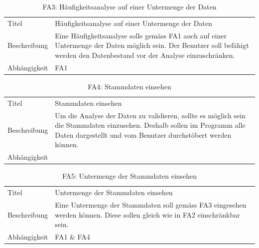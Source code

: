 \begin{table}[H] 
	\caption{FA3: Häufigkeitsanalyse auf einer Untermenge der Daten}
	\centering
	\label{fig:anforderungsanalyse:funktionaleanforderung:fa3}
	\begin{tabular}{ | l | L{10cm} | } 
		\hline 
		 \\ \hline 
		Titel & Häufigkeitsanalyse auf einer Untermenge der Daten \\ \hline 
		Beschreibung & Eine Häufigkeitsanalyse solle gemäss FA1 auch auf einer Untermenge der Daten möglich sein. Der Benutzer soll befähigt werden den Datenbestand vor der Analyse einzuschränken. \\ \hline 
		Abhängigkeit & FA1 \\ \hline 
	\end{tabular}
\end{table}

\begin{table}[H] 
	\caption{FA4: Stammdaten einsehen}
	\centering
	\label{fig:anforderungsanalyse:funktionaleanforderung:fa4}
	\begin{tabular}{ | l | L{10cm} | } 
		\hline 
		 \\ \hline 
		Titel & Stammdaten einsehen \\ \hline 
		Beschreibung & Um die Analyse der Daten zu validieren, sollte es möglich sein die Stammdaten einzusehen. Deshalb sollen im Programm alle Daten dargestellt und vom Benutzer durchstöbert werden können. \\ \hline 
		Abhängigkeit & \\ \hline 
	\end{tabular}
\end{table}

\begin{table}[H] 
	\caption{FA5: Untermenge der Stammdaten einsehen}
	\centering
	\label{fig:anforderungsanalyse:funktionaleanforderung:fa5}
	\begin{tabular}{ | l | L{10cm} | } 
		\hline 
		 \\ \hline 
		Titel & Untermenge der Stammdaten einsehen \\ \hline 
		Beschreibung & Eine Untermenge der Stammdaten soll gemäss FA3 eingesehen werden können. Diese sollen gleich wie in FA2 einschränkbar sein. \\ \hline 
		Abhängigkeit & FA1 \& FA4 \\ \hline 
	\end{tabular}
\end{table}

